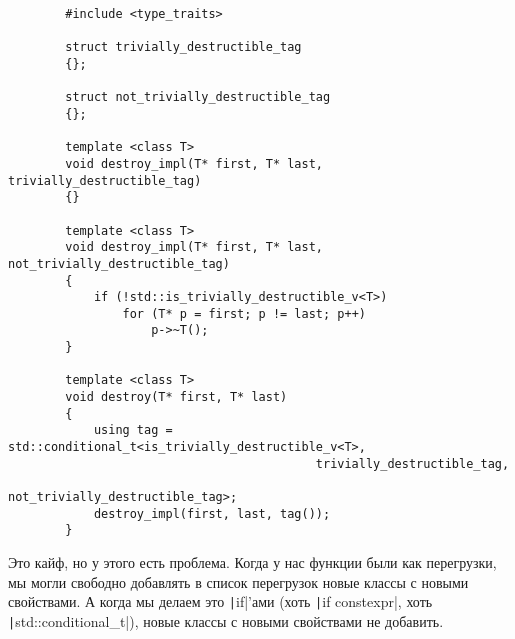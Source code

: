 \documentclass{article}
\begin{document}
    \begin{verbatim}
        #include <type_traits>

        struct trivially_destructible_tag
        {};

        struct not_trivially_destructible_tag
        {};

        template <class T>
        void destroy_impl(T* first, T* last, trivially_destructible_tag)
        {}

        template <class T>
        void destroy_impl(T* first, T* last, not_trivially_destructible_tag)
        {
            if (!std::is_trivially_destructible_v<T>)
                for (T* p = first; p != last; p++)
                    p->~T();
        }

        template <class T>
        void destroy(T* first, T* last)
        {
            using tag = std::conditional_t<is_trivially_destructible_v<T>,
                                           trivially_destructible_tag,
                                           not_trivially_destructible_tag>;
            destroy_impl(first, last, tag());
        }
    \end{verbatim}
    Это кайф, но у этого есть проблема. Когда у нас функции были как перегрузки, мы могли свободно добавлять в список перегрузок новые классы с новыми свойствами. А когда мы делаем это \texttt|if|'ами (хоть \texttt|if constexpr|, хоть \texttt|std::conditional_t|), новые классы с новыми свойствами не добавить.
\end{document}
